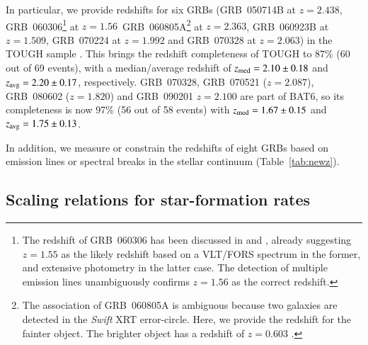 \documentclass[traditabstract, longauth]{aa}
\begin{document}
In particular, we provide redshifts for six GRBs (GRB~050714B at $z=2.438$, GRB~060306\footnote{The redshift of GRB~060306 has been discussed in \citet{2012ApJ...752...62J} and \citet{2013ApJ...778..128P}, already suggesting $z=1.55$ as the likely redshift based on a VLT/FORS spectrum in the former, and extensive photometry in the latter case. The detection of multiple emission lines unambiguously confirms $z=1.56$ as the correct redshift.} at $z=1.56$\, GRB~060805A\footnote{The association of GRB~060805A is ambiguous because two galaxies are detected in the \textit{Swift} XRT error-circle. Here, we provide the redshift for the fainter object. The brighter object has a redshift of $z=0.603$ \citep{2012ApJ...752...62J}.} at $z=2.363$, GRB~060923B at $z=1.509$, GRB~070224 at $z=1.992$ and GRB~070328 at $z=2.063$) in the TOUGH sample \citep{2012ApJ...756..187H}. This brings the redshift completeness of TOUGH to 87\% (60 out of 69 events), with a median/average redshift of $z_{\rm{med}} = 2.10\pm0.18$ and $z_{\rm{avg}}= 2.20\pm0.17$, respectively. GRB~070328, GRB~070521 ($z=2.087$), GRB~080602 ($z=1.820$) and GRB~090201 $z=2.100$ are part of BAT6, so its completeness is now 97\% (56 out of 58 events) with $z_{\rm{med}} = 1.67\pm0.15$ and $z_{\rm{avg}}= 1.75\pm0.13$.

In addition, we measure or constrain the redshifts of eight GRBs based on emission lines or spectral breaks in the stellar continuum  (Table~\ref{tab:newz}). 



\subsection{Scaling relations for star-formation rates}
\label{sec:newsc}
\end{document}
